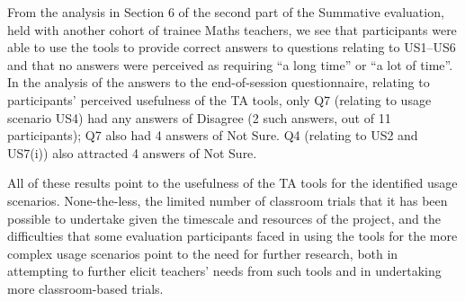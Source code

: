 From the analysis in Section 6 of the second part of the Summative
evaluation, held with another cohort of trainee Maths teachers, 
we see that participants were able to use the tools to provide
correct answers to questions relating to US1--US6 and that no
answers were perceived as requiring ``a long time'' or ``a lot of time''.
In the analysis of the answers to the end-of-session questionnaire,
relating to participants' perceived usefulness of the TA tools, 
only Q7 (relating to usage scenario US4) had any answers of Disagree 
(2 such answers, out of 11 participants); Q7 also had 4 answers of Not Sure.
Q4 (relating to US2 and US7(i)) also attracted 4 answers of Not Sure. 


All of these results point to the usefulness of the TA tools for the
identified usage scenarios. 
None-the-less, the limited number of classroom trials that
it has been possible to undertake given the timescale and resources of
the project, and the difficulties that some evaluation participants
faced in using the tools for the more complex usage scenarios 
point to the need for
further research, both in attempting to further elicit teachers' needs
from such tools and in undertaking more classroom-based trials.


% 
% 
 

